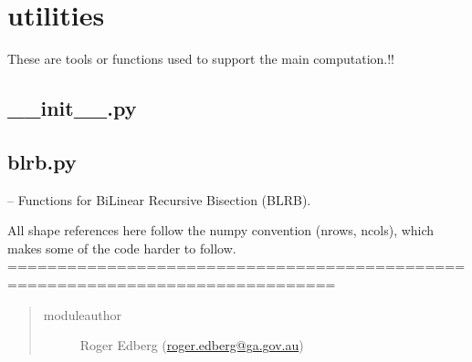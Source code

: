 \documentclass[letterpaper,10pt,english]{sphinxmanual}
\begin{document}
\section{utilities}
\label{docs/utilities::doc}\label{docs/utilities:utilities}
These are tools or functions used to support the main computation.!!


\subsection{\_\_init\_\_.py}
\label{docs/utilities:init-py}\label{docs/utilities:module-__init__}

\subsection{blrb.py}
\label{docs/utilities:module-blrb}\label{docs/utilities:blrb-py}
{\hyperref[docs/utilities:module-blrb]{}} -- Functions for BiLinear Recursive Bisection (BLRB).

All shape references here follow the numpy convention (nrows, ncols), which
makes some of the code harder to follow.
===============================================================================
\begin{quote}\begin{description}
\item[{moduleauthor}] \leavevmode
Roger Edberg (\href{mailto:roger.edberg@ga.gov.au}{roger.edberg@ga.gov.au})

\end{description}\end{quote}

\end{document}

